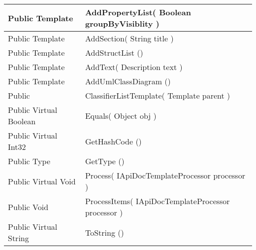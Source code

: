 \documentclass[11pt, oneside, a4paper]{book}
\begin{document}
\begin{center}
\begin{tabular}{| p{3cm} | p{12cm} | }
\hline
 Public  Template &  AddPropertyList(\hypertarget{SoftwareEngineeringTools.{}Documentation.{}ClassifierListTemplate.{}AddPropertyList\_Boolean}{} Boolean  groupByVisiblity  )\\
\hline
 Public  Template &  AddSection(\hypertarget{SoftwareEngineeringTools.{}Documentation.{}ClassifierListTemplate.{}AddSection\_String}{} String  title  )\\
\hline
 Public  Template &  AddStructList ()\hypertarget{SoftwareEngineeringTools.{}Documentation.{}ClassifierListTemplate.{}AddStructList}{}\\
\hline
 Public  Template &  AddText(\hypertarget{SoftwareEngineeringTools.{}Documentation.{}ClassifierListTemplate.{}AddText\_Description}{} Description  text  )\\
\hline
 Public  Template &  AddUmlClassDiagram ()\hypertarget{SoftwareEngineeringTools.{}Documentation.{}ClassifierListTemplate.{}AddUmlClassDiagram}{}\\
\hline
 Public  &  ClassifierListTemplate(\hypertarget{SoftwareEngineeringTools.{}Documentation.{}ClassifierListTemplate.{}ClassifierListTemplate\_Template}{} Template  parent  )\\
\hline
 Public  Virtual  Boolean &  Equals(\hypertarget{SoftwareEngineeringTools.{}Documentation.{}ClassifierListTemplate.{}Equals\_Object}{} Object  obj  )\\
\hline
 Public  Virtual  Int32 &  GetHashCode ()\hypertarget{SoftwareEngineeringTools.{}Documentation.{}ClassifierListTemplate.{}GetHashCode}{}\\
\hline
 Public  Type &  GetType ()\hypertarget{SoftwareEngineeringTools.{}Documentation.{}ClassifierListTemplate.{}GetType}{}\\
\hline
 Public  Virtual  Void &  Process(\hypertarget{SoftwareEngineeringTools.{}Documentation.{}ClassifierListTemplate.{}Process\_IApiDocTemplateProcessor}{} IApiDocTemplateProcessor  processor  )\\
\hline
 Public  Void &  ProcessItems(\hypertarget{SoftwareEngineeringTools.{}Documentation.{}ClassifierListTemplate.{}ProcessItems\_IApiDocTemplateProcessor}{} IApiDocTemplateProcessor  processor  )\\
\hline
 Public  Virtual  String &  ToString ()\hypertarget{SoftwareEngineeringTools.{}Documentation.{}ClassifierListTemplate.{}ToString}{}\\
\hline
\end{tabular}
\end{center}
 
\end{document}
